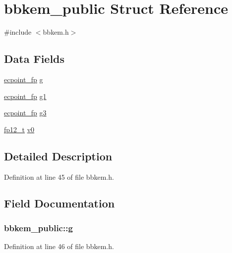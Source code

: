 \hypertarget{structbbkem__public}{\section{bbkem\-\_\-public Struct Reference}
\label{structbbkem__public}
}


{\ttfamily \#include $<$bbkem.\-h$>$}

\subsection*{Data Fields}
\begin{DoxyCompactItemize}
\item 
\hyperlink{structecpoint__fp}{ecpoint\-\_\-fp} \hyperlink{structbbkem__public_ab05bd70504481ea181d2123033d02f81}{g}
\item 
\hyperlink{structecpoint__fp}{ecpoint\-\_\-fp} \hyperlink{structbbkem__public_a8cba8a4f4756ce7e28951036268c474b}{g1}
\item 
\hyperlink{structecpoint__fp}{ecpoint\-\_\-fp} \hyperlink{structbbkem__public_af753ec02399a5af86b58aeedc890bdcd}{g3}
\item 
\hyperlink{types_8h_a1ec717386a6f4c8c019b5c6d651a2196}{fp12\-\_\-t} \hyperlink{structbbkem__public_a3debd6056f9930f3f521f72124b8c9cb}{v0}
\end{DoxyCompactItemize}


\subsection{Detailed Description}


Definition at line 45 of file bbkem.\-h.



\subsection{Field Documentation}
\hypertarget{structbbkem__public_ab05bd70504481ea181d2123033d02f81}{
\subsubsection[{g}]{ bbkem\-\_\-public\-::g}}\label{structbbkem__public_ab05bd70504481ea181d2123033d02f81}


Definition at line 46 of file bbkem.\-h.



